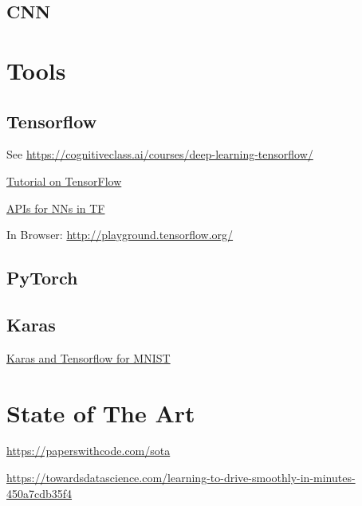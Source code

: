 \documentclass[]{article}
\begin{document}
\section{CNN}

\chapter{Tools}

\section{Tensorflow}

See \url{https://cognitiveclass.ai/courses/deep-learning-tensorflow/}

\href{https://medium.com/tensorflow/mit-deep-learning-basics-introduction-and-overview-with-tensorflow-355bcd26baf0}{\color{blue}Tutorial on TensorFlow}

\href{https://blog.thedataincubator.com/2017/09/the-apis-for-neural-networks-in-tensorflow/}{\color{blue}APIs for NNs in TF}

In Browser: \url{http://playground.tensorflow.org/}

\section{PyTorch}

\section{Karas}

\href{https://blog.thedataincubator.com/2018/03/tensorflow-keras-deep-learning/}{\color{blue}Karas and Tensorflow for MNIST}

\chapter{State of The Art}

\url{https://paperswithcode.com/sota}

\url{https://towardsdatascience.com/learning-to-drive-smoothly-in-minutes-450a7cdb35f4}
\end{document}
